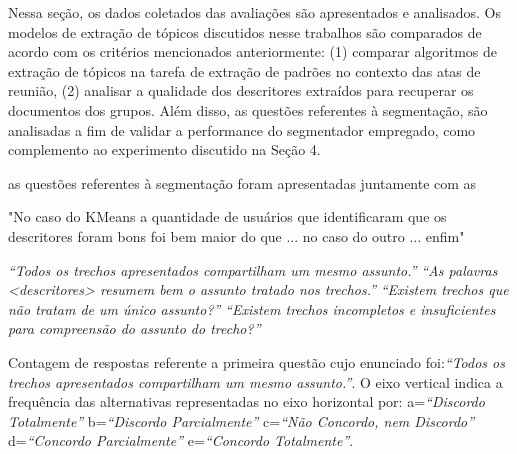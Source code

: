  Nessa seção, os dados coletados das avaliações são apresentados e analisados. Os
modelos de extração de tópicos discutidos nesse trabalhos são comparados de acordo com
os critérios mencionados anteriormente: (1) comparar algoritmos de extração de tópicos na
tarefa de extração de padrões no contexto das atas de reunião, (2) analisar a qualidade dos
descritores extraídos para recuperar os documentos dos grupos. Além disso, as questões
referentes à segmentação, são analisadas a fim de validar a performance do segmentador
empregado, como complemento ao experimento discutido na Seção 4.











as questões referentes à segmentação foram apresentadas juntamente com as 





"No caso do KMeans a quantidade de usuários que identificaram que os descritores foram bons foi bem maior do que ... no caso do outro ... enfim" 


\textit{``Todos os trechos apresentados compartilham um mesmo assunto.''}
\textit{``As palavras \textit{<descritores>} resumem bem o assunto tratado nos trechos.''}
\textit{``Existem trechos que não tratam de um único assunto?''}
\textit{``Existem trechos incompletos e insuficientes para compreensão do assunto do trecho?''}

	\caption{Contagem de respostas referente a primeira questão cujo enunciado foi:\textit{``Todos os trechos apresentados compartilham um mesmo assunto.''}. O eixo vertical indica a frequência das alternativas representadas no eixo horizontal por:
		a=\textit{``Discordo Totalmente''}
		b=\textit{``Discordo Parcialmente''}
		c=\textit{``Não Concordo, nem Discordo''}
		d=\textit{``Concordo Parcialmente''}
		e=\textit{``Concordo Totalmente''}.
	}













